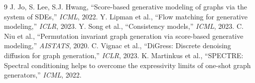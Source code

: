 \documentclass[10pt, twocolumn]{article}
\begin{document}
{\small

\begin{thebibliography}{9}
 J. Jo, S. Lee, S.J. Hwang, ``Score-based generative modeling of graphs via the system of SDEs,'' \textit{ICML}, 2022.
 Y. Lipman et al., ``Flow matching for generative modeling,'' \textit{ICLR}, 2023.
 Y. Song et al., ``Consistency models,'' \textit{ICML}, 2023.
 C. Niu et al., ``Permutation invariant graph generation via score-based generative modeling,'' \textit{AISTATS}, 2020.
 C. Vignac et al., ``DiGress: Discrete denoising diffusion for graph generation,'' \textit{ICLR}, 2023.
 K. Martinkus et al., ``SPECTRE: Spectral conditioning helps to overcome the expressivity limits of one-shot graph generators,'' \textit{ICML}, 2022.
\end{thebibliography}
}
\end{document}
